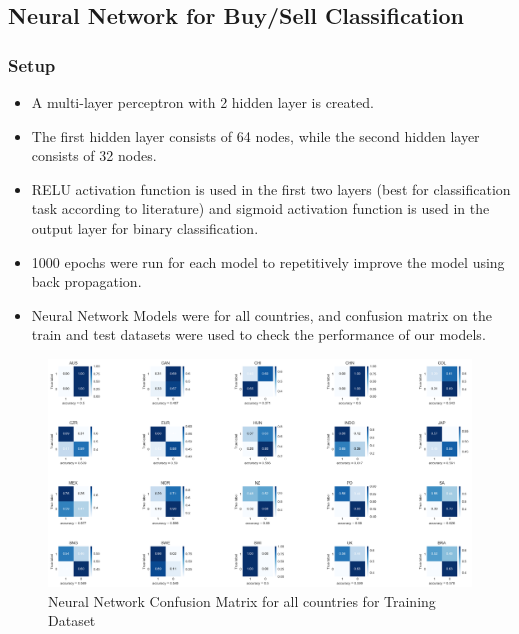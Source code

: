 \documentclass{article}
\begin{document}
\subsection{Neural Network for Buy/Sell Classification}
\vspace*{5mm}

\subsubsection{Setup}

\vspace*{5mm}

\begin{itemize}
  \item A multi-layer perceptron with 2 hidden layer is created.
  \item The first hidden layer consists of 64 nodes, while the second hidden layer consists of 32 nodes.
  \item RELU activation function is used in the first two layers (best for classification task according to literature) and sigmoid activation function is used in the output
        layer for binary classification.
  \item 1000 epochs were run for each model to repetitively improve the model using back propagation.
  \item Neural Network Models were for all countries, and confusion matrix on the train and test datasets were used to check the performance of our models.
\end{itemize}

\begin{figure}[H]
    \centering
    \hspace*{-1.25in}
    \includegraphics[scale = .30]{images/direction/n_cm_train.png}
    \caption{Neural Network Confusion Matrix for all countries for Training Dataset}
    \label{simulationfigure}
\end{figure}
\end{document}
